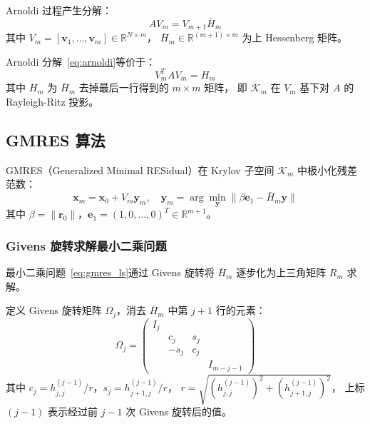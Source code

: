 Arnoldi 过程产生分解：
\begin{equation}
  A V_m = V_{m+1} \bar{H}_m
  \label{eq:arnoldi}
\end{equation}
其中 $V_m = [\mathbf{v}_1, \ldots, \mathbf{v}_m] \in \mathbb{R}^{N \times m}$，
$\bar{H}_m \in \mathbb{R}^{(m+1) \times m}$ 为上 Hessenberg 矩阵。

\begin{proposition}
  \label{prop:arnoldi_equiv}
  Arnoldi 分解~\eqref{eq:arnoldi}等价于：
  \begin{equation}
    V_m^T A V_m = H_m
  \end{equation}
  其中 $H_m$ 为 $\bar{H}_m$ 去掉最后一行得到的 $m \times m$ 矩阵，
  即 $\mathcal{K}_m$ 在 $V_m$ 基下对 $A$ 的 Rayleigh-Ritz 投影。
\end{proposition}

\subsection{GMRES 算法}

GMRES（Generalized Minimal RESidual）在 Krylov 子空间 $\mathcal{K}_m$ 中极小化残差范数：
\begin{equation}
  \mathbf{x}_m = \mathbf{x}_0 + V_m \mathbf{y}_m, \quad
  \mathbf{y}_m = \arg\min_{\mathbf{y}} \|\beta \mathbf{e}_1 - \bar{H}_m \mathbf{y}\|
  \label{eq:gmres_ls}
\end{equation}
其中 $\beta = \|\mathbf{r}_0\|$，$\mathbf{e}_1 = (1, 0, \ldots, 0)^T \in \mathbb{R}^{m+1}$。

\subsubsection{Givens 旋转求解最小二乘问题}

最小二乘问题~\eqref{eq:gmres_ls}通过 Givens 旋转将 $\bar{H}_m$ 逐步化为上三角矩阵 $R_m$ 求解。

定义 Givens 旋转矩阵 $\Omega_j$，消去 $\bar{H}_m$ 中第 $j+1$ 行的元素：
\begin{equation}
  \Omega_j = \begin{pmatrix}
    I_j & & & \\
    & c_j & s_j & \\
    & -s_j & c_j & \\
    & & & I_{m-j-1}
  \end{pmatrix}
\end{equation}
其中 $c_j = h_{j,j}^{(j-1)}/r$，$s_j = h_{j+1,j}^{(j-1)}/r$，
$r = \sqrt{(h_{j,j}^{(j-1)})^2 + (h_{j+1,j}^{(j-1)})^2}$，
上标 $(j-1)$ 表示经过前 $j-1$ 次 Givens 旋转后的值。

